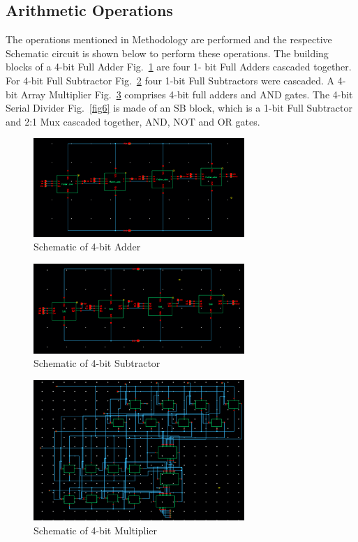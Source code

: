 \documentclass[conference]{IEEEtran}
\begin{document}
\subsection{Arithmetic Operations}\label{DA}
The operations mentioned in Methodology are performed and the respective Schematic circuit is shown below to perform these operations. The building blocks of a 4-bit  Full Adder Fig.~\ref{fig3} are four 1- bit Full Adders cascaded together. For 4-bit  Full Subtractor Fig.~\ref{fig4} four 1-bit Full Subtractors were cascaded. A 4-bit Array Multiplier Fig.~\ref{fig5} comprises 4-bit full adders and AND gates. The 4-bit Serial Divider Fig.~\ref{fig6} is made of an SB block, which is a 1-bit Full Subtractor and 2:1 Mux cascaded together, AND, NOT and OR gates.
\begin{figure}[H]
\centerline{\includegraphics[width=8cm,keepaspectratio,]{"4bit_Adder.png"}}
\caption{Schematic of 4-bit Adder}
\label{fig3}
\end{figure}
\begin{figure}[H]
\centerline{\includegraphics[width=8cm,keepaspectratio,]{"4bit_Subtractor.png"}}
\caption{Schematic of 4-bit Subtractor}
\label{fig4}
\end{figure}
\begin{figure}[H]
\centerline{\includegraphics[width=8cm,keepaspectratio,]{"4bit_Multiplier.png"}}
\caption{Schematic of 4-bit Multiplier}
\label{fig5}
\end{figure}
\end{document}
